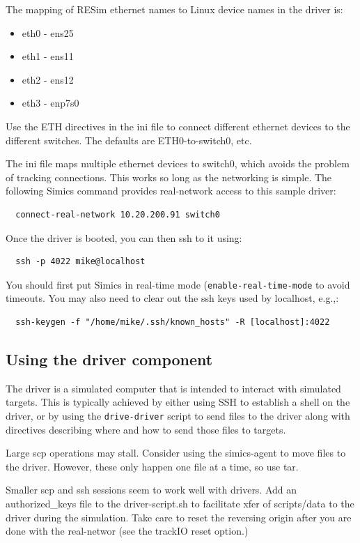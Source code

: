 \documentclass[titlepage]{article}
\begin{document}
\begin{appendices}
The mapping of RESim ethernet names to Linux device names in the driver is: 

\begin{itemize}
\item eth0 - ens25
\item eth1 - ens11
\item eth2 - ens12
\item eth3 - enp7s0
\end{itemize}

Use the ETH directives in the ini file to connect different ethernet devices to the
different switches.  The defaults are ETH0-to-switch0, etc.

The ini file maps multiple ethernet devices to switch0, which avoids the problem of
tracking connections.  This works so long as the networking is simple.
The following Simics command provides real-network access to this sample driver:
\begin{verbatim}
  connect-real-network 10.20.200.91 switch0
\end{verbatim}
Once the driver is booted, you can then ssh to it using:
\begin{verbatim}
  ssh -p 4022 mike@localhost
\end{verbatim}
You should first put Simics in real-time mode ({\tt enable-real-time-mode} to avoid timeouts.  You may also need to clear out the
ssh keys used by localhost, e.g.,:
\begin{verbatim}
  ssh-keygen -f "/home/mike/.ssh/known_hosts" -R [localhost]:4022
\end{verbatim}

\subsection{Using the driver component}
The driver is a simulated computer that is intended to interact with simulated targets.  This is typically
achieved by either using SSH to establish a shell on the driver, or by using the {\tt drive-driver}
script to send files to the driver along with directives describing where and how to send those files to
targets.  

Large scp operations may stall.  Consider using the simics-agent to move files to the driver.  However,
these only happen one file at a time, so use tar.

Smaller scp and ssh sessions seem to work well with drivers.  Add an authorized\_keys file to the driver-script.sh to facilitate xfer of scripts/data to the driver
during the simulation.  Take care to reset the reversing origin after you are done with the real-networ (see the trackIO reset option.)


\end{appendices}
\end{document}
